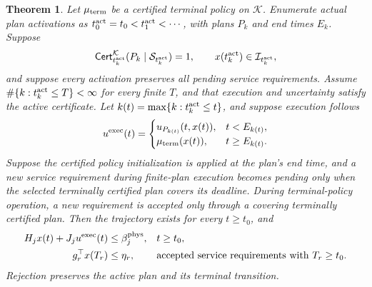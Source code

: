 \documentclass[final]{cas-sc}
\theoremstyle{definition}
\theoremstyle{plain}
\newtheorem{theorem}{Theorem}
\theoremstyle{definition}
\theoremstyle{plain}
\begin{document}
\begin{theorem}
\label{thm:backup-recursive-availability}
Let $\mu_{\rm term}$ be a certified terminal policy on $\mathcal K$. Enumerate
actual plan activations as $t_0^{\rm act}=t_0<t_1^{\rm act}<\cdots$,
with plans $P_k$ and end times $E_k$. Suppose
\[
\mathsf{Cert}^{\mathcal K}_{t_k^{\rm act}}
 (P_k\mid\mathcal S_{t_k^{\rm act}})=1,\qquad
x(t_k^{\rm act})\in\mathcal I_{t_k^{\rm act}},
\]
and suppose every activation preserves all pending service requirements.
Assume $\#\{k:t_k^{\rm act}\le T\}<\infty$ for every finite $T$, and
that execution and uncertainty satisfy the active certificate. Let $k(t)=\max\{k:t_k^{\rm act}\le t\}$, and suppose execution follows
\begin{equation}
u^{\rm exec}(t)=\begin{cases}
u_{P_{k(t)}}(t,x(t)),&t<E_{k(t)},\\
\mu_{\rm term}(x(t)),&t\ge E_{k(t)}.
\end{cases}
\label{eq:terminal-execution-policy}
\end{equation}
Suppose the certified policy initialization is applied at the plan's end time, and
a new service requirement during finite-plan execution becomes pending
only when the selected terminally certified plan covers its deadline.
During terminal-policy operation, a new requirement is accepted only
through a covering terminally certified plan. Then the trajectory exists
for every $t\ge t_0$, and
\begin{equation}
\begin{aligned}
H_jx(t)+J_ju^{\rm exec}(t)&\le\beta_j^{\rm phys},
 &&t\ge t_0,\\
g_r^\top x(T_r)&\le\eta_r,
 &&\text{accepted service requirements with }T_r\ge t_0.
\end{aligned}
\label{eq:terminal-global-guarantee}
\end{equation}
Rejection preserves the active plan and its terminal transition.
\end{theorem}
\end{document}
